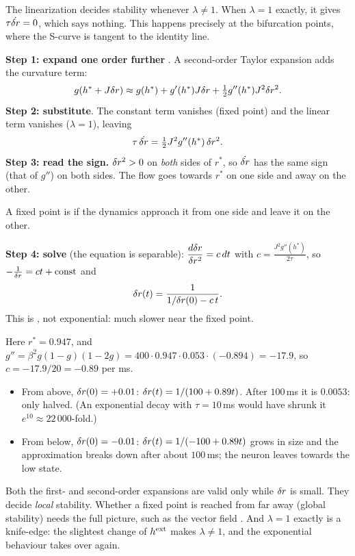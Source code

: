 The linearization decides stability whenever $\lambda\neq1$. When $\lambda=1$ exactly, it gives $\tau\dot{\delta r}=0$, which says nothing. This happens precisely at the bifurcation points, where the S-curve is tangent to the identity line.

\textbf{Step 1: expand one order further} . A second-order Taylor expansion adds the curvature term:
\[ g(h^*+J\delta r) \approx g(h^*) + g'(h^*)J\delta r + \tfrac12 g''(h^*)J^2\delta r^2. \]
\textbf{Step 2: substitute}. The constant term vanishes (fixed point) and the linear term vanishes ($\lambda=1$), leaving
\[ \tau\,\dot{\delta r} = \tfrac12 J^2 g''(h^*)\,\delta r^2. \]
\textbf{Step 3: read the sign.} $\delta r^2>0$ on \emph{both} sides of $r^*$, so $\dot{\delta r}$ has the same sign (that of $g''$) on both sides. The flow goes towards $r^*$ on one side and away on the other.

\begin{defn}
A fixed point is  if the dynamics approach it from one side and leave it on the other.
\end{defn}

\textbf{Step 4: solve} (the equation is separable): $\displaystyle\frac{d\delta r}{\delta r^2} = c\,dt$ with $c = \frac{J^2g''(h^*)}{2\tau}$, so $-\frac{1}{\delta r} = ct + \text{const}$ and
\[ \delta r(t) = \frac{1}{1/\delta r(0) - c\,t}. \]
This is , not exponential: much slower near the fixed point.

\begin{example}[At the bifurcation point $\hext=-0.803$ ($\beta=20$, $J=1$, $\tau=10$\,ms)]
Here $r^*=0.947$, and $g'' = \beta^2 g(1-g)(1-2g) = 400\cdot0.947\cdot0.053\cdot(-0.894) = -17.9$, so $c = -17.9/20 = -0.89$ per ms.
\begin{itemize}
  \item From above, $\delta r(0)=+0.01$: $\delta r(t) = 1/(100+0.89t)$. After $100$\,ms it is $0.0053$: only halved. (An exponential decay with $\tau=10$\,ms would have shrunk it $e^{10}\approx 22\,000$-fold.)
  \item From below, $\delta r(0)=-0.01$: $\delta r(t) = 1/(-100+0.89t)$ grows in size and the approximation breaks down after about $100$\,ms; the neuron leaves towards the low state.
\end{itemize}
\end{example}

\begin{pitfall}
Both the first- and second-order expansions are valid only while $\delta r$ is small. They decide \emph{local} stability. Whether a fixed point is reached from far away (global stability) needs the full picture, such as the vector field .
And $\lambda=1$ exactly is a knife-edge: the slightest change of $h^{\text{ext}}$ makes $\lambda\neq1$, and the exponential behaviour takes over again.
\end{pitfall}

